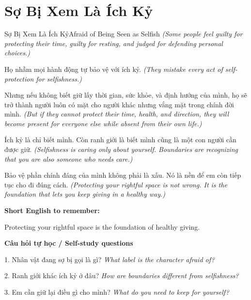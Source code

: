 \section{Sợ Bị Xem Là Ích Kỷ}
\begin{truyen}{Sợ Bị Xem Là Ích Kỷ}{Afraid of Being Seen as Selfish}
\textit{(Some people feel guilty for protecting their time, guilty for resting, and judged for defending personal choices.)}

Họ nhầm mọi hành động tự bảo vệ với ích kỷ.
\textit{(They mistake every act of self-protection for selfishness.)}

Nhưng nếu không biết giữ lấy thời gian, sức khỏe, và định hướng của mình, họ sẽ trở thành người luôn có mặt cho người khác nhưng vắng mặt trong chính đời mình.
\textit{(But if they cannot protect their time, health, and direction, they will become present for everyone else while absent from their own life.)}

Ích kỷ là chỉ biết mình. Còn ranh giới là biết mình cũng là một con người cần được giữ.
\textit{(Selfishness is caring only about yourself. Boundaries are recognizing that you are also someone who needs care.)}

\end{truyen}

\begin{baihoc}
Bảo vệ phần chính đáng của mình không phải là xấu. Nó là nền để em còn tiếp tục cho đi đúng cách.
\textit{(Protecting your rightful space is not wrong. It is the foundation that lets you keep giving in a healthy way.)}
\end{baihoc}

\begin{ghinhoanh}
\textbf{Short English to remember:}

Protecting your rightful space is the foundation of healthy giving.

\end{ghinhoanh}

\begin{tuhocnhanh}
\textbf{Câu hỏi tự học / Self-study questions}

1. Nhân vật đang sợ bị gọi là gì? \textit{What label is the character afraid of?}

2. Ranh giới khác ích kỷ ở đâu? \textit{How are boundaries different from selfishness?}

3. Em cần giữ lại điều gì cho mình? \textit{What do you need to keep for yourself?}
\end{tuhocnhanh}
\ngancach

